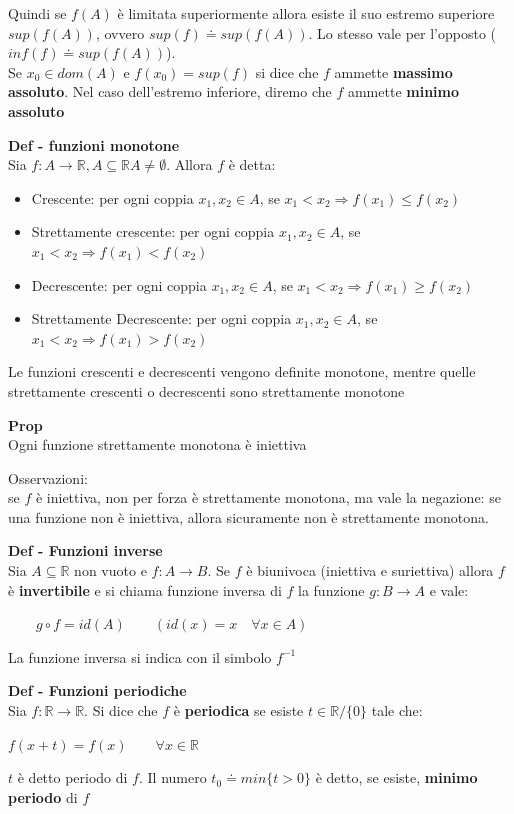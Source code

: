\documentclass[12pt, a4paper]{article}
\begin{document}
    Quindi se $f(A)$ è limitata superiormente allora esiste il suo estremo superiore $sup(f(A))$, ovvero
$sup(f)\doteq sup(f(A))$. Lo stesso vale per l'opposto ($inf(f)\doteq sup(f(A))$).\\ Se $x_{0}\in dom(A)$
    e $f(x_{0})=sup(f)$ si dice che $f$ ammette \textbf{massimo assoluto}. Nel caso dell'estremo inferiore,
    diremo che $f$ ammette \textbf{minimo assoluto}

    \textbf{Def - funzioni monotone}\\Sia $f:A\rightarrow\mathbb{R},  A\subseteq\mathbb{R}  A\neq\emptyset$.
    Allora $f$ è detta:
    \begin{itemize}
        \item Crescente: per ogni coppia $x_{1},x_{2}\in A$, se $x_{1}<x_{2}\Rightarrow f(x_{1})\leq f(x{_2})$
        \item Strettamente crescente: per ogni coppia $x_{1},x_{2}\in A$, se $x_{1}<x_{2}\Rightarrow f(x_{1})<f(x{_2})$
        \item Decrescente: per ogni coppia $x_{1},x_{2}\in A$, se $x_{1}<x_{2}\Rightarrow f(x_{1})\geq f(x{_2})$
        \item Strettamente Decrescente: per ogni coppia $x_{1},x_{2}\in A$, se $x_{1}<x_{2}\Rightarrow f(x_{1})>f(x{_2})$
    \end{itemize}
    Le funzioni crescenti e decrescenti vengono definite monotone, mentre quelle strettamente crescenti o decrescenti
    sono strettamente monotone

    \textbf{Prop}\\Ogni funzione strettamente monotona è iniettiva

    Osservazioni:\\se $f$ è iniettiva, non per forza è strettamente monotona, ma vale la negazione: se una funzione
    non è iniettiva, allora sicuramente non è strettamente monotona.

    \textbf{Def - Funzioni inverse}\\Sia $A\subseteq\mathbb{R}$ non vuoto e $f:A\rightarrow B$. Se $f$ è biunivoca
    (iniettiva e suriettiva) allora $f$ è \textbf{invertibile} e si chiama funzione inversa di $f$ la funzione
$g:B\rightarrow A$ e vale:
    \begin{center}
        $\qquad g\circ f= id(A)\qquad (id(x)=x\quad \forall x\in A)$
    \end{center}
    La funzione inversa si indica con il simbolo $f^{-1}$

    \textbf{Def - Funzioni periodiche}\\Sia $f:\mathbb{R}\rightarrow\mathbb{R}$. Si dice che $f$ è \textbf{periodica}
    se esiste $t\in\mathbb{R}/\{0\}$ tale che:
    \begin{center}
        $f(x+t)=f(x)\qquad \forall x\in\mathbb{R}$
    \end{center}
$t$ è detto periodo di $f$. Il numero $t_{0}\doteq min\{t>0\}$ è detto, se esiste, \textbf{minimo periodo} di $f$
\end{document}
